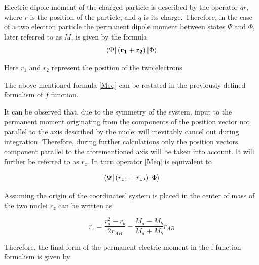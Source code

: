 \documentclass{pracalicmgr}
\begin{document}
Electric dipole moment of the charged particle is described by the operator $qr$, where $r$ is the position of the particle, and $q$ is its charge. Therefore, in the case of a two electron particle the 
permanent dipole moment between states $\Psi$ and $\Phi$, later referred to as $M$, is given by the formula \cite{Moper}
\begin{equation}
    \bra{\Psi}\left(\mathbf{r_1} + \mathbf{r_2}\right)\Ket{\Phi}
    \label{Meq}
\end{equation}

Here $r_1$ and $r_2$ represent the position of the two electrons

The above-mentioned formula \ref{Meq} can be restated in the previously defined formalism of $f$ function.

It can be observed that, due to the symmetry of the system, input to the permanent moment originating from the components of the position vector not parallel to the axis described by the nuclei will inevitably cancel out during integration. Therefore, during further calculations only the position vectors component parallel to the aforementioned axis will be taken into account. It will further be referred to as $r_z$. In turn operator \ref{Meq} is equivalent to 

\begin{equation}
    \bra{\Psi}\left({r_z}_1 + {r_z}_2\right)\Ket{\Phi}
    \label{MeqRz}
\end{equation}

Assuming the origin of the coordinates' system is placed in the center of mass of the two nuclei $r_z$ can be written as

\begin{equation}
    r_z = \frac{r_a^2 - r_b}{2r_{AB}} - \frac{M_a-M_b}{M_a + M_b}r_{AB}
    \label{rz}
\end{equation}

Therefore, the final form of the permanent electric moment in the f function formalism is given by
\end{document}
